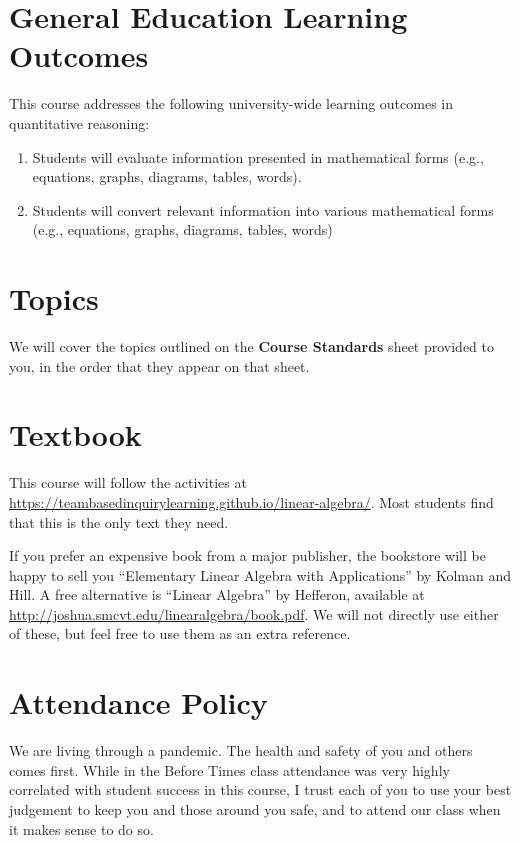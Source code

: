\documentclass{article}
\begin{document}
\section*{\fontsize{12}{15}\selectfont General Education Learning Outcomes}
This course addresses the following university-wide learning outcomes in quantitative reasoning:
\begin{enumerate}[1)]
\item Students will evaluate information presented in mathematical forms (e.g., equations, graphs, diagrams, tables, words).
\item Students will convert relevant information into various mathematical forms (e.g., equations, graphs, diagrams, tables, words)
\end{enumerate}


\section*{\fontsize{12}{15}\selectfont Topics}
We will cover the topics outlined on the \textbf{Course Standards}
sheet provided to you, in the order that they appear on that sheet.


\section*{\fontsize{12}{15}\selectfont Textbook}
This course will follow the activities at \url{https://teambasedinquirylearning.github.io/linear-algebra/}. Most students find that this is the only text they need.

If you prefer an expensive book from a major publisher, the bookstore will be happy to sell you ``Elementary Linear Algebra with Applications'' by Kolman and Hill.  A free alternative is ``Linear Algebra'' by Hefferon, available at \url{http://joshua.smcvt.edu/linearalgebra/book.pdf}. We will not directly use either of these, but feel free to use them as an extra reference.


\section*{\fontsize{12}{15}\selectfont Attendance Policy}
We are living through a pandemic. The health and safety of you and others comes first. While in the Before Times class attendance was very highly correlated with student success in this course, I trust each of you to use your best judgement to keep you and those around you safe, and to attend our class when it makes sense to do so.
\end{document}
